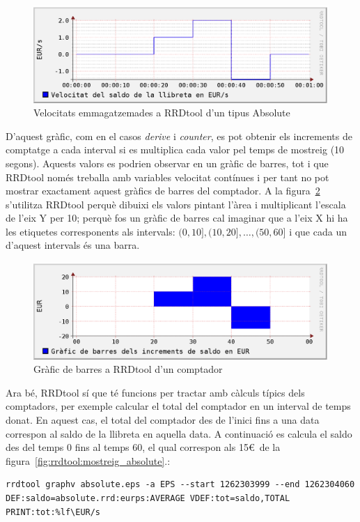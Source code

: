 \begin{figure}[htp]
  \centering
  \includegraphics[width=\textwidth]{imatges/rrdtool/absolute.eps}
  \caption{Velocitats emmagatzemades a RRDtool d'un tipus Absolute}
  \label{fig:rrdtool:absolute}
\end{figure}

D'aquest gràfic, com en el casos \emph{derive} i \emph{counter}, es pot obtenir els increments de comptatge a cada interval si es multiplica cada valor pel temps de mostreig (10 segons). Aquests valors es podrien observar en un gràfic de barres, tot i que RRDtool només treballa amb variables velocitat contínues i per tant no pot mostrar exactament aquest gràfics de barres del comptador. A la figura~\ref{fig:rrdtool:comptador_barres} s'utilitza RRDtool perquè dibuixi els valors pintant l'àrea i multiplicant l'escala de l'eix Y per 10; perquè fos un gràfic de barres cal imaginar que a l'eix X hi ha les etiquetes corresponents als intervals: $(0,10], (10,20], \ldots, (50,60]$ i que cada un d'aquest intervals és una barra.

\begin{figure}[htp]
  \centering
  \includegraphics[width=\textwidth]{imatges/rrdtool/comptador_barres.eps}
  \caption{Gràfic de barres a RRDtool d'un comptador}
  \label{fig:rrdtool:comptador_barres}
\end{figure}

Ara bé, RRDtool sí que té funcions per tractar amb càlculs típics dels comptadors, per exemple calcular el total del comptador en un interval de temps donat. En aquest cas, el total del comptador des de l'inici fins a una data correspon al saldo de la llibreta en aquella data. A continuació es calcula el saldo des del temps 0 fins al temps 60, el qual correspon als 15\euro\ de la figura~\ref{fig:rrdtool:mostreig_absolute}.:
\begin{lstlisting}[style=sh]
rrdtool graphv absolute.eps -a EPS --start 1262303999 --end 1262304060 DEF:saldo=absolute.rrd:eurps:AVERAGE VDEF:tot=saldo,TOTAL PRINT:tot:%lf\EUR/s
\end{lstlisting}

